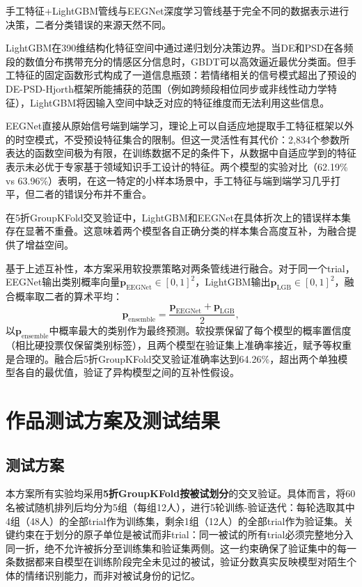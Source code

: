 \documentclass[UTF8,zihao=-4,fontset=windows]{ctexart}
\numberwithin{equation}{section}
\numberwithin{figure}{section}
\numberwithin{table}{section}
\begin{document}
手工特征+LightGBM管线与EEGNet深度学习管线基于完全不同的数据表示进行决策，二者分类错误的来源天然不同。

LightGBM在390维结构化特征空间中通过递归划分决策边界。当DE和PSD在各频段的数值分布携带充分的情感区分信息时，GBDT可以高效逼近最优分类面。但手工特征的固定函数形式构成了一道信息瓶颈：若情绪相关的信号模式超出了预设的DE-PSD-Hjorth框架所能捕获的范围（例如跨频段相位同步或非线性动力学特征），LightGBM将因输入空间中缺乏对应的特征维度而无法利用这些信息。

EEGNet直接从原始信号端到端学习，理论上可以自适应地提取手工特征框架以外的时空模式，不受预设特征集合的限制。但这一灵活性有其代价：2,834个参数所表达的函数空间极为有限，在训练数据不足的条件下，从数据中自适应学到的特征表示未必优于专家基于领域知识手工设计的特征。两个模型的实验对比（62.19\% vs 63.96\%）表明，在这一特定的小样本场景中，手工特征与端到端学习几乎打平，但二者的错误分布并不重合。

在5折GroupKFold交叉验证中，LightGBM和EEGNet在具体折次上的错误样本集存在显著不重叠。这意味着两个模型各自正确分类的样本集合高度互补，为融合提供了增益空间。

基于上述互补性，本方案采用软投票策略对两条管线进行融合。对于同一个trial，EEGNet输出类别概率向量$\boldsymbol{p}_{\text{EEGNet}} \in [0,1]^2$，LightGBM输出$\boldsymbol{p}_{\text{LGB}} \in [0,1]^2$，融合概率取二者的算术平均：
\begin{equation}
\boldsymbol{p}_{\text{ensemble}} = \frac{\boldsymbol{p}_{\text{EEGNet}} + \boldsymbol{p}_{\text{LGB}}}{2},
\label{eq:ensemble}
\end{equation}
以$\boldsymbol{p}_{\text{ensemble}}$中概率最大的类别作为最终预测。软投票保留了每个模型的概率置信度（相比硬投票仅保留类别标签），且两个模型在验证集上准确率接近，赋予等权重是合理的。融合后5折GroupKFold交叉验证准确率达到64.26\%，超出两个单独模型各自的最优值，验证了异构模型之间的互补性假设。

\section{作品测试方案及测试结果}

\subsection{测试方案}

本方案所有实验均采用\textbf{5折GroupKFold按被试划分}的交叉验证。具体而言，将60名被试随机排列后均分为5组（每组12人），进行5轮训练-验证迭代：每轮选取其中4组（48人）的全部trial作为训练集，剩余1组（12人）的全部trial作为验证集。关键约束在于划分的原子单位是被试而非trial：同一被试的所有trial必须完整地分入同一折，绝不允许被拆分至训练集和验证集两侧。这一约束确保了验证集中的每一条数据都来自模型在训练阶段完全未见过的被试，验证分数真实反映模型对陌生个体的情绪识别能力，而非对被试身份的记忆。
\end{document}
